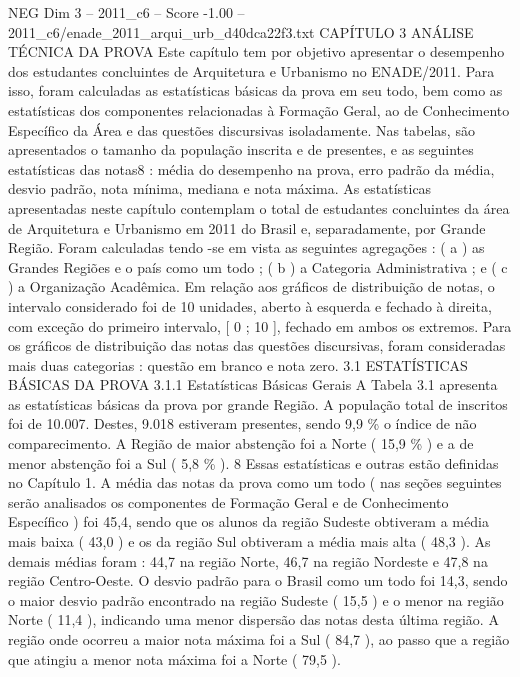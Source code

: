 \begin{textsample}{NEG Dim 3 – 2011\_c6 – Score -1.00 – 2011\_c6/enade\_2011\_arqui\_urb\_d40dca22f3.txt}  \label{ex:f3_neg_075}
CAPÍTULO 3 ANÁLISE TÉCNICA DA PROVA Este capítulo tem por objetivo apresentar o desempenho dos estudantes concluintes de Arquitetura e Urbanismo no ENADE/2011.
Para isso, foram calculadas as estatísticas básicas da prova em seu todo, bem como as estatísticas dos componentes relacionadas à Formação Geral, ao de Conhecimento Específico da Área e das questões discursivas isoladamente.
Nas tabelas, são apresentados o tamanho da população inscrita e de presentes, e as seguintes estatísticas das notas8 : média do desempenho na prova, erro padrão da média, desvio padrão, nota mínima, mediana e nota máxima.
As estatísticas apresentadas neste capítulo contemplam o total de estudantes concluintes da área de Arquitetura e Urbanismo em 2011 do Brasil e, separadamente, por Grande Região.
Foram calculadas tendo -se em vista as seguintes agregações : ( a ) as Grandes Regiões e o país como um todo ; ( b ) a Categoria Administrativa ; e ( c ) a Organização Acadêmica.
Em relação aos gráficos de distribuição de notas, o intervalo considerado foi de 10 unidades, aberto à esquerda e fechado à direita, com exceção do primeiro intervalo, [ 0 ; 10 ], fechado em ambos os extremos.
Para os gráficos de distribuição das notas das questões discursivas, foram consideradas mais duas categorias : questão em branco e nota zero. 3.1 ESTATÍSTICAS BÁSICAS DA PROVA 3.1.1 Estatísticas Básicas Gerais A Tabela 3.1 apresenta as estatísticas básicas da prova por grande Região.
A população total de inscritos foi de 10.007.
Destes, 9.018 estiveram presentes, sendo 9,9 \% o índice de não comparecimento.
A Região de maior abstenção foi a Norte ( 15,9 \% ) e a de menor abstenção foi a Sul ( 5,8 \% ). 8 Essas estatísticas e outras estão definidas no Capítulo 1.
A média das notas da prova como um todo ( nas seções seguintes serão analisados os componentes de Formação Geral e de Conhecimento Específico ) foi 45,4, sendo que os alunos da região Sudeste obtiveram a média mais baixa ( 43,0 ) e os da região Sul obtiveram a média mais alta ( 48,3 ).
As demais médias foram : 44,7 na região Norte, 46,7 na região Nordeste e 47,8 na região Centro-Oeste.
O desvio padrão para o Brasil como um todo foi 14,3, sendo o maior desvio padrão encontrado na região Sudeste ( 15,5 ) e o menor na região Norte ( 11,4 ), indicando uma menor dispersão das notas desta última região.
A região onde ocorreu a maior nota máxima foi a Sul ( 84,7 ), ao passo que a região que atingiu a menor nota máxima foi a Norte ( 79,5 ).

\end{textsample}
